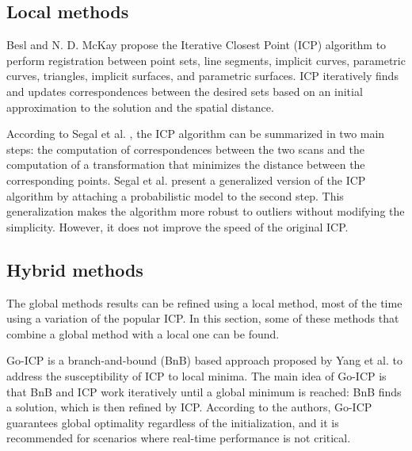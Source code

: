         \subsection{Local methods} 

        Besl and N. D. McKay \cite{Besl_1992_amethod} propose the Iterative Closest Point (ICP) algorithm to perform registration 
        between point sets, line segments, implicit curves, parametric curves, triangles, implicit surfaces, and parametric surfaces.
        ICP iteratively finds and updates correspondences between the desired sets based on an initial approximation to the solution and 
        the spatial distance.

        According to Segal et al. \cite{Segal_2009_generalizedicp}, the ICP algorithm can be summarized in two main steps:
        the computation of correspondences between the two scans and 
        the computation of a transformation that minimizes the distance between the corresponding points.
        Segal et al. present a generalized version of the ICP algorithm by attaching a probabilistic model to the second step.
        This generalization makes the algorithm more robust to outliers without modifying the simplicity. 
        However, it does not improve the speed of the original ICP.


        \subsection{Hybrid methods} 

        The global methods results can be refined using a local method, most of the time using a variation of the popular ICP. 
        In this section, some of these methods that combine a global method with a local one can be found.

        Go-ICP is a branch-and-bound (BnB) based approach proposed by Yang et al. \cite{Yang_2016_goicp} to address the susceptibility of ICP to local minima. 
        The main idea of Go-ICP is that BnB and ICP work iteratively until a global minimum is reached: BnB finds a solution, which is then refined by ICP.
        According to the authors, Go-ICP guarantees global optimality regardless of the initialization, and it is recommended for scenarios where real-time performance is not critical.

